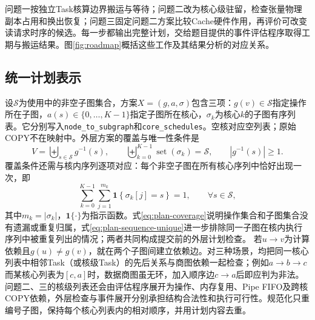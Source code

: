 问题一按独立Task核算边界搬运与等待；问题二改为核心级驻留，检查张量物理副本占用和换出恢复；问题三固定问题二方案比较Cache硬件作用，再评价可改变读请求时序的候选。每一步都输出完整计划，交给题目提供的事件评估程序取得工期与搬运结果。图\ref{fig:roadmap}概括这些工作及其结果分析的对应关系。

\subsection{统一计划表示}
设$\mathcal S$为使用中的非空子图集合，方案$X=(g,a,\sigma)$包含三项：$g(v)\in\mathcal S$指定操作所在子图，$a(s)\in\{0,\ldots,K-1\}$指定子图所在核心，$\sigma_k$为核心$k$的子图有序列表。它分别写入\texttt{node\_to\_subgraph}和\texttt{core\_schedules}。空核对应空列表；原始COPY不在映射中。外层方案的覆盖与唯一性条件是
\begin{equation}
V=\biguplus_{s\in\mathcal S}g^{-1}(s),\qquad
\biguplus_{k=0}^{K-1}\operatorname{set}(\sigma_k)=\mathcal S,
\qquad |g^{-1}(s)|\ge1.
\label{eq:plan-coverage}
\end{equation}
覆盖条件还需与核内序列逐项对应：每个非空子图在所有核心序列中恰好出现一次，即
\begin{equation}
\sum_{k=0}^{K-1}\sum_{j=1}^{m_k}
\mathbf 1\!\left\{\sigma_k[j]=s\right\}=1,
\qquad \forall s\in\mathcal S,
\label{eq:plan-sequence-unique}
\end{equation}
其中$m_k=|\sigma_k|$，$\mathbf 1\{\cdot\}$为指示函数。式\eqref{eq:plan-coverage}说明操作集合和子图集合没有遗漏或重复归属，式\eqref{eq:plan-sequence-unique}进一步排除同一子图在核内执行序列中被重复列出的情况；两者共同构成提交前的外层计划检查。
若$u\to v$为计算依赖且$g(u)\ne g(v)$，就在两个子图间建立依赖边。对三种场景，均把同一核心列表中相邻Task（或核级Task）的先后关系与商图依赖一起检查；例如$a\to b\to c$而某核心列表为$[c,a]$时，数据商图虽无环，加入顺序边$c\to a$后即应判为非法。问题二、三的核级列表还会由评估程序展开为操作、内存复用、Pipe FIFO及跨核COPY依赖，外层检查与事件展开分别承担结构合法性和执行可行性。规范化只重编号子图，保持每个核心列表内的相对顺序，并用计划内容去重。
